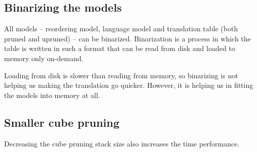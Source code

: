 \subsection{Binarizing the models}
All models -- reordering model, language model and translation table (both pruned and upruned) -- can be binarized. Binarization is a process in which the table is written in such a format that can be read from disk and loaded to memory only on-demand.

Loading from disk is slower than reading from memory, so binarizing is not helping us making the translation go quicker. However, it is helping us in fitting the models into memory at all.


\subsection{Smaller cube pruning}

Decreasing the cube pruning stack size also increases the time performance.